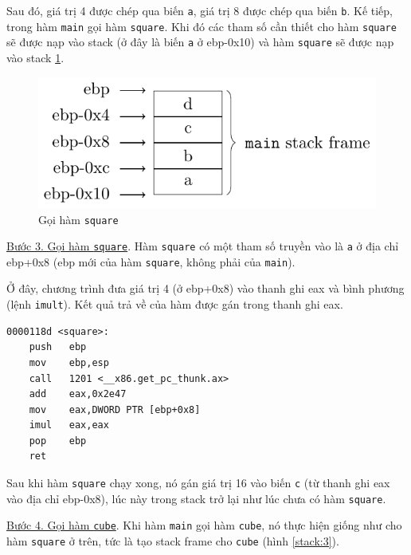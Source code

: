 Sau đó, giá trị 4 được chép qua biến \texttt{a}, giá trị 8 được chép qua biến \texttt{b}. Kế tiếp, trong hàm \texttt{main} gọi hàm \texttt{square}. Khi đó các tham số cần thiết cho hàm \texttt{square} sẽ được nạp vào stack (ở đây là biến \texttt{a} ở ebp-0x10) và hàm \texttt{square} sẽ được nạp vào stack \ref{stack:2}.

\begin{figure}[ht]
    \centering
    \includegraphics[page=2]{assembly/stack.pdf}
    \caption{Gọi hàm \texttt{square}}
    \label{stack:2}
\end{figure}

\underline{Bước 3. Gọi hàm \texttt{square}}. Hàm \texttt{square} có một tham số truyền vào là \texttt{a} ở địa chỉ ebp+0x8 (ebp mới của hàm \texttt{square}, không phải của \texttt{main}).

Ở đây, chương trình đưa giá trị 4 (ở ebp+0x8) vào thanh ghi eax và bình phương (lệnh \texttt{imult}). Kết quả trả về của hàm được gán trong thanh ghi eax.

\begin{lstlisting}[language={[x86masm]Assembler}]
0000118d <square>:
    push   ebp
    mov    ebp,esp
    call   1201 <__x86.get_pc_thunk.ax>
    add    eax,0x2e47
    mov    eax,DWORD PTR [ebp+0x8]
    imul   eax,eax
    pop    ebp
    ret 
\end{lstlisting}



Sau khi hàm \texttt{square} chạy xong, nó gán giá trị 16 vào biến \texttt{c} (từ thanh ghi eax vào địa chỉ ebp-0x8), lúc này trong stack trở lại như lúc chưa có hàm \texttt{square}.

\underline{Bước 4. Gọi hàm \texttt{cube}}. Khi hàm \texttt{main} gọi hàm \texttt{cube}, nó thực hiện giống như cho hàm \texttt{square} ở trên, tức là tạo stack frame cho \texttt{cube} (hình \ref{stack:3}).

